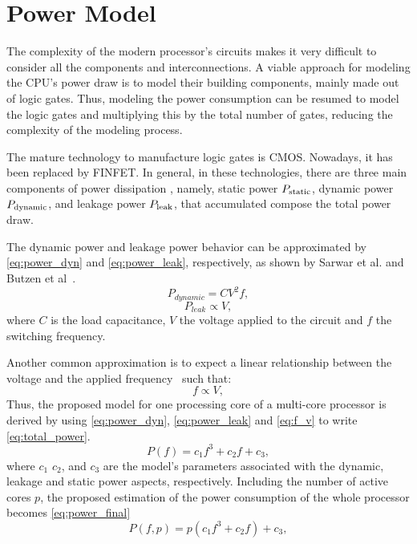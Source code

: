 \section{Power Model} \label{sec:powermodel}
The complexity of the modern processor's circuits makes it very difficult to consider all the components and interconnections. A viable approach for modeling the CPU's power draw is to model their building components, mainly made out of logic gates. Thus, modeling the power consumption can be resumed to model the logic gates and multiplying this by the total number of gates, reducing the complexity of the modeling process.

The mature technology to manufacture logic gates is CMOS. Nowadays, it has been replaced by FINFET. In general, in these technologies, there are three main components of power dissipation \cite{Rauber2014, Goel2016, Du2017, Gonzalez1997},  namely, static power $P_{\rm static}$, dynamic power $P_{\rm dynamic}$, and leakage power $P_{\rm leak}$, that accumulated compose the total power draw.

The dynamic power and leakage power behavior can be approximated by \cref{eq:power_dyn} and \cref{eq:power_leak}, respectively, as shown by Sarwar et al. and Butzen et al~\cite{Sarwar1997, Butzen2007}.
\begin{equation}
P_{dynamic}=CV^2f,
\label{eq:power_dyn}
\end{equation}
\begin{equation}
P_{leak} \propto V,
\label{eq:power_leak}
\end{equation}
where $C$ is the load capacitance, $V$ the voltage applied to the circuit and $f$ the switching frequency.

Another common approximation is to expect a linear relationship between the voltage and the applied frequency~\cite{Usman2013ANoC} such that:
\begin{equation}
f \propto V,
\label{eq:f_v}
\end{equation}
Thus, the proposed model for one processing core of a multi-core processor is derived by using \cref{eq:power_dyn}, \cref{eq:power_leak} and \cref{eq:f_v} to write \cref{eq:total_power}.
\begin{equation}
P(f)= c_1f^3+c_2f+c_3,
\label{eq:total_power}
\end{equation}
where $c_1$ $c_2$, and $c_3$ are the model's parameters associated with the dynamic, leakage and static power aspects, respectively. Including the number of active cores $p$, the proposed estimation of the power consumption of the whole processor becomes \cref{eq:power_final}
\begin{equation}
P(f,p)= p(c_1f^3+c_2f)+c_3,
\label{eq:power_final}
\end{equation}

